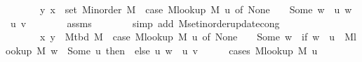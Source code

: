 \begin{isabellebody}
\ \ \ \ \ \ \ {\isacharparenleft}{\kern0pt}y{\isacharcomma}{\kern0pt}\ x{\isacharparenright}{\kern0pt}\ {\isasymin}\ set\ {\isacharparenleft}{\kern0pt}M{\isacharunderscore}{\kern0pt}inorder\ M{\isacharparenright}{\kern0pt}\ {\isacharminus}{\kern0pt}\ {\isacharparenleft}{\kern0pt}case\ M{\isacharunderscore}{\kern0pt}lookup\ M\ u\ of\ None\ {\isasymRightarrow}\ {\isacharbraceleft}{\kern0pt}{\isacharbraceright}{\kern0pt}\ {\isacharbar}{\kern0pt}\ Some\ w\ {\isasymRightarrow}\ {\isacharbraceleft}{\kern0pt}{\isacharparenleft}{\kern0pt}u{\isacharcomma}{\kern0pt}\ w{\isacharparenright}{\kern0pt}{\isacharbraceright}{\kern0pt}{\isacharparenright}{\kern0pt}\ {\isasymunion}\ {\isacharbraceleft}{\kern0pt}{\isacharparenleft}{\kern0pt}u{\isacharcomma}{\kern0pt}\ v{\isacharparenright}{\kern0pt}{\isacharbraceright}{\kern0pt}{\isachardoublequoteclose}\isanewline
\ \ \ \ \ \ \isamarkupfalse%
\ assms\isanewline
\ \ \ \ \ \ \isamarkupfalse%
\ {\isacharparenleft}{\kern0pt}simp\ add{\isacharcolon}{\kern0pt}\ M{\isachardot}{\kern0pt}set{\isacharunderscore}{\kern0pt}inorder{\isacharunderscore}{\kern0pt}update{\isacharunderscore}{\kern0pt}cong{\isacharparenright}{\kern0pt}\isanewline
\ \ \ \ \isamarkupfalse%
\ \isamarkupfalse%
\isanewline
\ \ \ \ \ \ {\isachardoublequoteopen}{\isachardot}{\kern0pt}{\isachardot}{\kern0pt}{\isachardot}{\kern0pt}\ {\isasymlongleftrightarrow}\isanewline
\ \ \ \ \ \ \ {\isacharbraceleft}{\kern0pt}x{\isacharcomma}{\kern0pt}\ y{\isacharbraceright}{\kern0pt}\ {\isasymin}\ M{\isacharunderscore}{\kern0pt}tbd\ M\ {\isacharminus}{\kern0pt}\ {\isacharparenleft}{\kern0pt}case\ M{\isacharunderscore}{\kern0pt}lookup\ M\ u\ of\ None\ {\isasymRightarrow}\ {\isacharbraceleft}{\kern0pt}{\isacharbraceright}{\kern0pt}\ {\isacharbar}{\kern0pt}\ Some\ w\ {\isasymRightarrow}\ if\ w\ {\isasymnoteq}\ u\ {\isasymand}\ M{\isacharunderscore}{\kern0pt}lookup\ M\ w\ {\isacharequal}{\kern0pt}\ Some\ u\ then\ {\isacharbraceleft}{\kern0pt}{\isacharbraceright}{\kern0pt}\ else\ {\isacharbraceleft}{\kern0pt}{\isacharbraceleft}{\kern0pt}u{\isacharcomma}{\kern0pt}\ w{\isacharbraceright}{\kern0pt}{\isacharbraceright}{\kern0pt}{\isacharparenright}{\kern0pt}\ {\isasymunion}\ {\isacharbraceleft}{\kern0pt}{\isacharbraceleft}{\kern0pt}u{\isacharcomma}{\kern0pt}\ v{\isacharbraceright}{\kern0pt}{\isacharbraceright}{\kern0pt}{\isachardoublequoteclose}\isanewline
\ \ \ \ \isamarkupfalse%
\ {\isacharparenleft}{\kern0pt}cases\ {\isachardoublequoteopen}M{\isacharunderscore}{\kern0pt}lookup\ M\ u{\isachardoublequoteclose}{\isacharparenright}{\kern0pt}\isanewline

\end{isabellebody}
